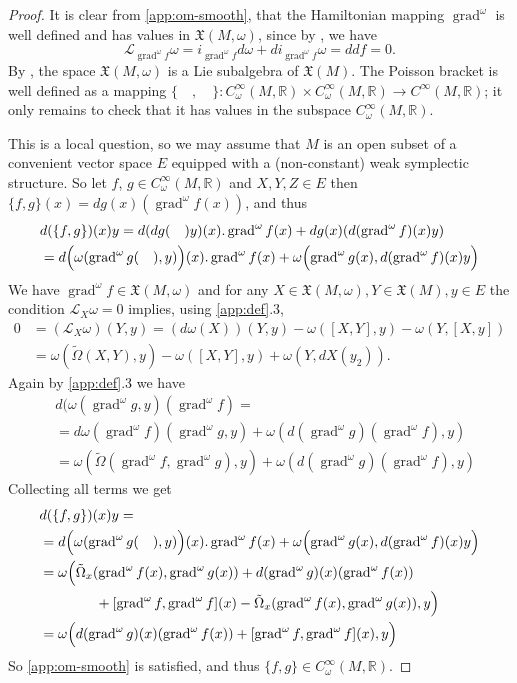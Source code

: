 \documentclass[12pt]{amsart}
\theoremstyle{definition}
\def\om{\omega}
\def\Om{\Omega}
\def\x{\times}
\def\X{{\mathfrak X}}
\let\on=\operatorname
\begin{document}
\begin{proof}
It is clear from \ref{app:om-smooth}, that the
Hamiltonian mapping $\on{grad}^\om$ is well defined 
and has values in $\X(M,\om)$, 
since by \cite[34.18.6 ]{kriegl_michor_1997convenient}, we have
\begin{displaymath}
\mathcal{L}_{\on{grad}^\om f}\om = i_{\on{grad}^\om f}d\om + 
     di_{\on{grad}^\om f}\om =ddf =0.
\end{displaymath}
By \cite[34.18.7]{kriegl_michor_1997convenient}, the space $\X(M,\om)$ is a Lie 
subalgebra of $\X(M)$.
The Poisson
bracket is well defined as a mapping
$\{\quad,\quad\}: C^\infty_\om (M,\mathbb R) \x
C^\infty_\om (M,\mathbb R) \to  
C^\infty(M,\mathbb R) $;
it only remains to check that it has values in the subspace
$C^\infty_\om (M,\mathbb R)$.  

This is a local question, so we may assume that $M$ is an open subset 
of a con\-ven\-ient vector space $E$ equipped with a (non-constant) weak 
symplectic structure. 
So let $f$, $g\in C^\infty_\om (M,\mathbb R)$ and $X,Y,Z\in E$ then
$\{f,g\}(x) = dg(x)(\on{grad}^\om f(x))$, and thus
\begin{align*} 
&d(\{f,g\})(x)y
= d(dg(\quad)y)(x).\on{grad}^\om f(x) + dg(x)(d(\on{grad}^\om f)(x)y)
\\&
 = d\Big(\om(\on{grad}^\om g(\quad),y)\Big)(x).\on{grad}^\om f(x)
     + \om\Bigl(\on{grad}^\om g(x),d(\on{grad}^\om f)(x)y\Bigr)
\end{align*}
We have $\on{grad}^\om f\in\X(M,\om)$ and for any
$X\in\X(M,\om), Y\in\X(M), y\in E$ the condition 
$\mathcal{L}_X\om=0$ implies, using \ref{app:def}.3,
\begin{align*}
0&=(\mathcal L_X\om)(Y,y) = (d\om(X))(Y,y) - \om([X,Y],y) -\om(Y,[X,y])  
\\&
= \om(\tilde\Om(X,Y),y) - \om([X,Y],y) + \om(Y,dX(y_2)).
\end{align*}
Again by \ref{app:def}.3 we have
\begin{align*}
&d(\om(\on{grad}^\om g,y)(\on{grad}^\om f) =
\\&
= d\om(\on{grad}^\om f)(\on{grad}^\om g,y)  
+\om(d(\on{grad}^\om g)(\on{grad}^\om f),y)
\\&
= \om(\tilde\Om(\on{grad}^\om f,\on{grad}^\om g),y)  
+\om(d(\on{grad}^\om g)(\on{grad}^\om f),y)
\end{align*}
Collecting all terms we get
\begin{align*}
&d(\{f,g\})(x)y =
\\&
= d\Big(\om(\on{grad}^\om g(\quad),y)\Big)(x).\on{grad}^\om f(x)
     + \om\Bigl(\on{grad}^\om g(x),d(\on{grad}^\om f)(x)y\Bigr)
\\&
=\om\Big(
\tilde\Om_x(\on{grad}^\om f(x),\on{grad}^\om g(x))
+ d(\on{grad}^\om g)(x)(\on{grad}^\om f(x))
\\&\qquad\qquad
+[\on{grad}^\om f,\on{grad}^\om f](x)
-\tilde\Om_x(\on{grad}^\om f(x),\on{grad}^\om g(x)),
y
\Big)
\\&
=\om\Big(
d(\on{grad}^\om g)(x)(\on{grad}^\om f(x))
+[\on{grad}^\om f,\on{grad}^\om f](x),
y
\Big)
\end{align*}
So \ref{app:om-smooth} is satisfied, and thus 
$\{f,g\}\in C^\infty_\om (M,\mathbb R)$.


\end{proof}
\end{document}
